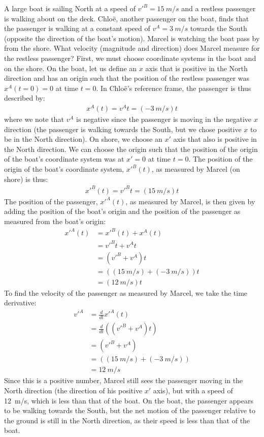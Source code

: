 \begin{example}{A large boat is sailing North at a speed of $v'^B=\SI{15}{m/s}$ and a restless passenger is walking about on the deck. Chlo\"e, another passenger on the boat, finds that the passenger is walking at a constant speed of $v^A=\SI{3}{m/s}$ towards the South (opposite the direction of the boat's motion). Marcel is watching the boat pass by from the shore. What velocity (magnitude and direction) does Marcel measure for the restless passenger?}
First, we must choose coordinate systems in the boat and on the shore. On the boat, let us define an $x$ axis that is positive in the North direction and has an origin such that the position of the restless passenger was $x^A(t=0)=0$ at time $t=0$. In Chlo\"e's reference frame, the passenger is thus described by:
\begin{align*}
x^A(t)=v^At=(\SI{-3}{m/s})t
\end{align*}
where we note that $v^A$ is negative since the passenger is moving in the negative $x$ direction (the passenger is walking towards the South, but we chose positive $x$ to be in the North direction). On shore, we choose an $x'$ axis that also is positive in the North direction. We can choose the origin such that the position of the origin of the boat's coordinate system was at $x'=0$ at time $t=0$. The position of the origin of the boat's coordinate system, $x'^B(t)$, as measured by Marcel (on shore) is thus:
\begin{align*}
x'^B(t)=v'^Bt=(\SI{15}{m/s})t
\end{align*}
The position of the passenger, $x'^A(t)$, as measured by Marcel, is then given by adding the position of the boat's origin and the position of the passenger as measured from the boat's origin:
\begin{align*}
x'^A(t) &= x'^B(t)+x^A(t)\\
&= v'^Bt + v^At \\
&= (v'^B+v^A)t\\
&= ((\SI{15}{m/s})+(\SI{-3}{m/s}))t\\
&= (\SI{12}{m/s})t
\end{align*}
To find the velocity of the passenger as measured by Marcel, we take the time derivative:
\begin{align*}
v'^A &= \frac{d}{dt}x'^A(t)\\
&= \frac{d}{dt} \left((v'^B+v^A)t\right)\\
&=(v'^B+v^A)\\
&=((\SI{15}{m/s})+(\SI{-3}{m/s}))\\
&=\SI{12}{m/s}
\end{align*}
Since this is a positive number, Marcel still sees the passenger moving in the North direction (the direction of his positive $x'$ axis), but with a speed of \SI{12}{m/s}, which is less than that of the boat. On the boat, the passenger appears to be walking towards the South, but the net motion of the passenger relative to the ground is still in the North direction, as their speed is less than that of the boat.
\end{example}


